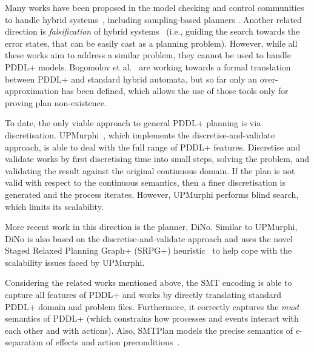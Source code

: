 Many works have been proposed in the model checking and control communities to handle hybrid systems~\cite{hycomp,nuxmv,smthybrid,pappas,maly}, including sampling-based planners \cite{rrt,sampl}. Another related direction is  \textit{falsification} of hybrid systems~\cite{falsif} (i.e., guiding the search towards the error states, that can be easily cast as a planning problem). However, while all these works aim to address a similar problem, they cannot be used to handle PDDL+ models. Bogomolov et al.~\cite{bogomolov14,bogomolov15} are working towards a formal translation between PDDL+ and standard hybrid automata, but so far only an over-approximation has been defined, which allows the use of those tools only for proving plan non-existence.

To date, the only viable approach to general PDDL+ planning is via discretisation. UPMurphi~\cite{upmurphi}, which implements the discretise-and-validate approach, is able to deal with the full range of PDDL+ features. Discretise and validate works by first discretising time into small steps, solving the problem, and validating the result against the original continuous domain. If the plan is not valid with respect to the continuous semantics, then a finer discretisation is generated and the process iterates. However, UPMurphi performs blind search, which limits its scalability.

More recent work in this direction is the planner, DiNo. Similar to UPMurphi, DiNo is also based on the discretise-and-validate approach and uses the novel Staged Relaxed Planning Graph+ (SRPG+) heuristic~\cite{piotrowski2016heuristic} to help cope with the scalability issues faced by UPMurphi.

Considering the related works mentioned above, the SMT encoding is able to capture all features of PDDL+ and works by directly translating standard PDDL+ domain and problem files. Furthermore, it correctly captures the \textit{must} semantics of PDDL+ (which constrains how processes and events interact with each other and with actions). Also, SMTPlan models the precise semantics of $\epsilon$-separation of effects and action preconditions~\cite{pddl+}.

